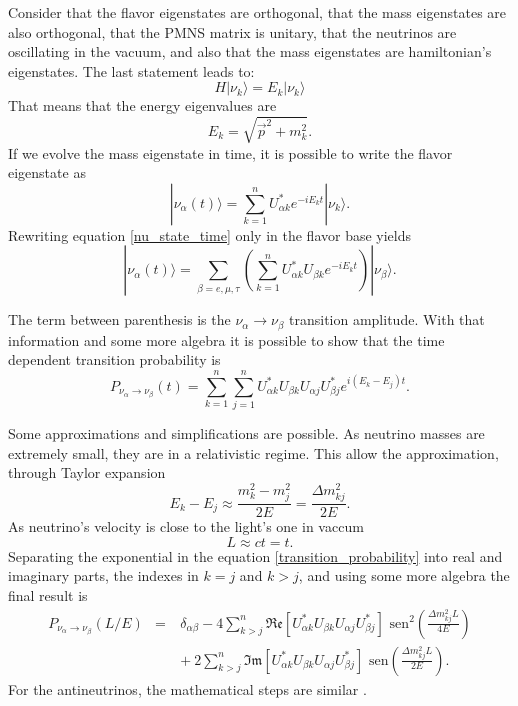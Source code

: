 Consider that the flavor eigenstates are orthogonal, that the mass eigenstates are also orthogonal, that the PMNS matrix is unitary, that the neutrinos are oscillating in the vacuum, and also that the mass eigenstates are hamiltonian's eigenstates. The last statement leads to:
%
\begin{equation}
	H|\nu_k \rangle = E_k |\nu_k \rangle
	\label{nu_schrodinger}
\end{equation}
%
That means that the energy eigenvalues are
%
\begin{equation}
	E_k = \sqrt{\vec{p}^2 + m_k^2}.
	\label{nu_energy}
\end{equation}
%
If we evolve the mass eigenstate in time, it is possible to write the flavor eigenstate as
%
\begin{equation}
	|\nu_\alpha (t) \rangle = \sum_{k=1}^n U^*_{\alpha k} e^{-iE_kt}|\nu_k \rangle.
	\label{nu_state_time}
\end{equation}
%
Rewriting equation \ref{nu_state_time} only in the flavor base yields 
%
\begin{equation}
	|\nu_\alpha (t)\rangle = \sum_{\beta = e, \mu, \tau} \left( \sum_{k=1}^n U^*_{\alpha k} U_{\beta k} e^{-iE_kt} \right) |\nu_\beta \rangle.
	\label{nu_state_time_2}
\end{equation}
%

The term between parenthesis is the $\nu_\alpha \rightarrow \nu_\beta$ transition amplitude. With that information and some more algebra it is possible to show that the time dependent transition probability is
\begin{equation}
	P_{\nu_\alpha \rightarrow \nu_\beta}(t) = \sum_{k=1}^n \sum_{j=1}^n U^*_{\alpha k} U_{\beta k} U_{\alpha j} U^*_{\beta j} e^{i(E_k - E_j)t}.
	\label{transition_probability}
\end{equation}

Some approximations and simplifications are possible. As neutrino masses are extremely small, they are in a relativistic regime. This allow the approximation, through Taylor expansion 
%
\begin{equation}
	E_k - E_j \approx \frac{m^2_k - m^2_j}{2E} = \frac{\Delta m^2_{kj}}{2E}.
	\label{nu_Ej-Ek}
\end{equation}
%
As neutrino's velocity is close to the light's one in vaccum 
%
\begin{equation}
	L \approx ct = t.
	\label{nu_L}
\end{equation}
%
Separating the exponential in the equation \ref{transition_probability} into real and imaginary parts, the indexes in $k=j$ and $k>j$, and using some more algebra the final result is
%
\begin{eqnarray}
	P_{\nu_\alpha \rightarrow \nu_\beta} (L/E) & = & \delta_{\alpha\beta} - 4\sum_{k>j}^n  \mathfrak{Re}[U^*_{\alpha k} U_{\beta k} U_{\alpha j} U^*_{\beta j}]\text{ sen}^2\left(\frac{\Delta m^2_{kj} L}{4E} \right) \nonumber \\
	& \quad & + \ 2\sum_{k>j}^n\mathfrak{Im}[U^*_{\alpha k} U_{\beta k} U_{\alpha j} U^*_{\beta j}]\text{ sen}\left(\frac{\Delta m^2_{kj} L}{2E} \right).
	\label{nu_oscillation_final}
\end{eqnarray}
%
For the antineutrinos, the mathematical steps are similar \cite{oscillation_math}. 

